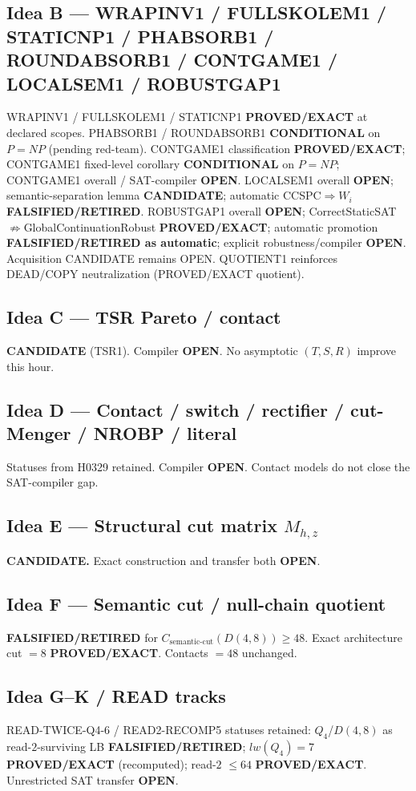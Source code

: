 \documentclass[11pt]{article}
\begin{document}
\subsection*{Idea B --- WRAPINV1 / FULLSKOLEM1 / STATICNP1 / PHABSORB1 / ROUNDABSORB1 / CONTGAME1 / LOCALSEM1 / ROBUSTGAP1}
WRAPINV1 / FULLSKOLEM1 / STATICNP1 \textbf{PROVED/EXACT} at declared scopes.
PHABSORB1 / ROUNDABSORB1 \textbf{CONDITIONAL} on $P=NP$ (pending red-team).
CONTGAME1 classification \textbf{PROVED/EXACT}; CONTGAME1 fixed-level corollary
\textbf{CONDITIONAL} on $P=NP$; CONTGAME1 overall / SAT-compiler \textbf{OPEN}.
LOCALSEM1 overall \textbf{OPEN}; semantic-separation lemma \textbf{CANDIDATE};
automatic CCSPC$\Rightarrow W_i$ \textbf{FALSIFIED/RETIRED}.
ROBUSTGAP1 overall \textbf{OPEN}; CorrectStaticSAT$\not\Rightarrow$GlobalContinuationRobust
\textbf{PROVED/EXACT}; automatic promotion \textbf{FALSIFIED/RETIRED as automatic};
explicit robustness/compiler \textbf{OPEN}.
Acquisition CANDIDATE remains OPEN.
QUOTIENT1 reinforces DEAD/COPY neutralization (PROVED/EXACT quotient).

\subsection*{Idea C --- TSR Pareto / contact}
\textbf{CANDIDATE} (TSR1). Compiler \textbf{OPEN}. No asymptotic $(T,S,R)$ improve this hour.

\subsection*{Idea D --- Contact / switch / rectifier / cut-Menger / NROBP / literal}
Statuses from H0329 retained. Compiler \textbf{OPEN}. Contact models do not close the SAT-compiler gap.

\subsection*{Idea E --- Structural cut matrix $M_{h,z}$}
\textbf{CANDIDATE.} Exact construction and transfer both \textbf{OPEN}.

\subsection*{Idea F --- Semantic cut / null-chain quotient}
\textbf{FALSIFIED/RETIRED} for $C_{\mathrm{semantic\textrm{-}cut}}(D(4,8))\ge48$.
Exact architecture cut $=8$ \textbf{PROVED/EXACT}. Contacts $=48$ unchanged.

\subsection*{Idea G--K / READ tracks}
READ-TWICE-Q4-6 / READ2-RECOMP5 statuses retained: $Q_4$/$D(4,8)$ as read-$2$-surviving LB
\textbf{FALSIFIED/RETIRED}; $lw(Q_4)=7$ \textbf{PROVED/EXACT} (recomputed); read-$2$ $\le64$
\textbf{PROVED/EXACT}. Unrestricted SAT transfer \textbf{OPEN}.
\end{document}
